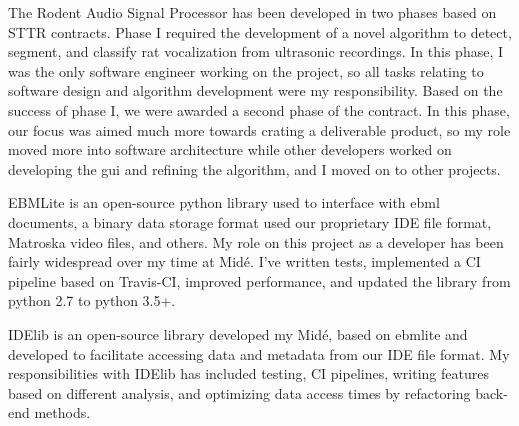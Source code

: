 \documentclass[letterpaper]{deedy-resume} %
\begin{document}
The Rodent Audio Signal Processor has been developed in two phases based on STTR contracts.  Phase I required the development of a novel algorithm to detect, segment, and classify rat vocalization from ultrasonic recordings.  In this phase, I was the only software engineer working on the project, so all tasks relating to software design and algorithm development were my responsibility.  Based on the success of phase I, we were awarded a second phase of the contract.  In this phase, our focus was aimed much more towards crating a deliverable product, so my role moved more into software architecture while other developers worked on developing the gui and refining the algorithm, and I moved on to other projects.

\sectionspace %



EBMLite is an open-source python library used to interface with ebml documents, a binary data storage format used our proprietary IDE file format, Matroska video files, and others.  My role on this project as a developer has been fairly widespread over my time at Midé.  I've written tests, implemented a CI pipeline based on Travis-CI, improved performance, and updated the library from python 2.7 to python 3.5+.

\sectionspace %



IDElib is an open-source library developed my Midé, based on ebmlite and developed to facilitate accessing data and metadata from our IDE file format.  My responsibilities with IDElib has included testing, CI pipelines, writing features based on different analysis, and optimizing data access times by refactoring back-end methods.

\sectionspace %


\end{document}
